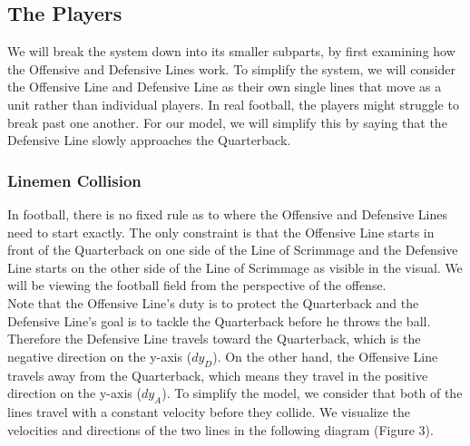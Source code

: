 \subsection{The Players}

\quad We will break the system down into its smaller subparts, by first examining how the Offensive and Defensive Lines work. To simplify the system, we will consider the Offensive Line and Defensive Line as their own single lines that move as a unit rather than individual players. In real football, the players might struggle to break past one another. For our model, we will simplify this by saying that the Defensive Line slowly approaches the Quarterback.

\subsubsection{Linemen Collision}
\quad  In football, there is no fixed rule as to where the Offensive and Defensive Lines need to start exactly. The only constraint is that the Offensive Line starts in front of the Quarterback on one side of the Line of Scrimmage and the Defensive Line starts on the other side of the Line of Scrimmage as visible in the visual. We will be viewing the football field from the perspective of the offense. \\

Note that the Offensive Line’s duty is to protect the Quarterback and the Defensive Line’s goal is to tackle the Quarterback before he throws the ball. Therefore the Defensive Line travels toward the Quarterback, which is the negative direction on the y-axis ($dy_D$). On the other hand, the Offensive Line travels away from the Quarterback, which means they travel in the positive direction on the y-axis ($dy_A$). To simplify the model, we consider that both of the lines travel with a constant velocity before they collide. We visualize the velocities and directions of the two lines in the following diagram (Figure 3). \\


